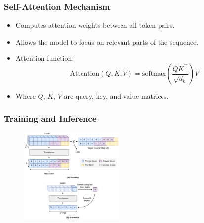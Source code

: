 \documentclass[14pt,aspectratio=169]{beamer}
\theoremstyle{remark}
\begin{document}
\begin{frame}
    \frametitle{Self-Attention Mechanism}
    \begin{itemize}
        \item Computes attention weights between all token pairs.
        \item Allows the model to focus on relevant parts of the sequence.
        \item Attention function:
              \[
                  \text{Attention}(Q, K, V) = \text{softmax}\left( \frac{Q K^\top}{\sqrt{d_k}} \right) V
              \]
        \item Where $Q$, $K$, $V$ are query, key, and value matrices.
    \end{itemize}
\end{frame}

\begin{frame}
    \frametitle{Training and Inference}
    \begin{figure}
        \centering
        \includegraphics[width=0.45\textwidth]{fig/training_and_inference.pdf}
    \end{figure}
\end{frame}
\end{document}
